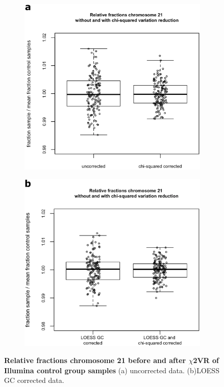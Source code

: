 \begin{figure}[h]
	\begin{subfigure}{.5\textwidth}
		\centering
		\includegraphics[width=1\linewidth]{img/NIPT_Supp1_Fig1_6a}
		\label{fig:NIPT_Supp1_Fig1_6a}
	\end{subfigure}%
	\begin{subfigure}{.5\textwidth}
		\centering
		\includegraphics[width=1\linewidth]{img/NIPT_Supp1_Fig1_6b}
		\label{fig:NIPT_Supp1_Fig1_6b}
	\end{subfigure} 
	\caption[Relative fractions chromosome 21 before and after $\chi$2VR]{\textbf{Relative fractions chromosome 21 before and after $\chi$2VR of Illumina control group samples} (a) uncorrected data. (b)LOESS GC corrected data.}
	\label{fig:NIPT_Supp1_Fig1_6}
\end{figure}


